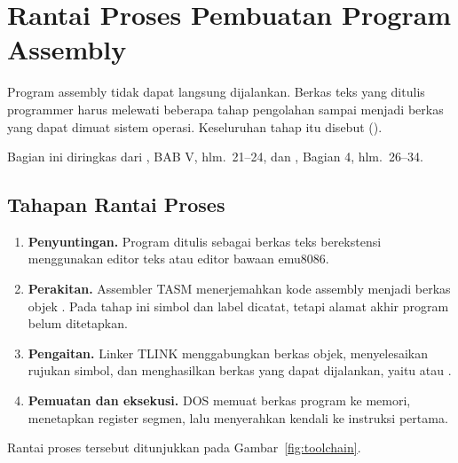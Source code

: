 \section{Rantai Proses Pembuatan Program Assembly}
\label{sec:rantai-proses}

Program assembly tidak dapat langsung dijalankan. Berkas teks yang
ditulis programmer harus melewati beberapa tahap pengolahan sampai
menjadi berkas yang dapat dimuat sistem operasi. Keseluruhan tahap
itu disebut  ().

Bagian ini diringkas dari \cite{sto2001}, BAB V, hlm.~21--24, dan
\cite{gunawan2019}, Bagian 4, hlm.~26--34.

\subsection{Tahapan Rantai Proses}

\begin{enumerate}
    \item \textbf{Penyuntingan.} Program ditulis sebagai berkas teks
          berekstensi  menggunakan editor teks atau editor
          bawaan emu8086.

    \item \textbf{Perakitan.} Assembler TASM menerjemahkan kode
          assembly menjadi berkas objek . Pada tahap ini
          simbol dan label dicatat, tetapi alamat akhir program belum
          ditetapkan.

    \item \textbf{Pengaitan.} Linker TLINK menggabungkan berkas objek,
          menyelesaikan rujukan simbol, dan menghasilkan berkas yang
          dapat dijalankan, yaitu  atau .

    \item \textbf{Pemuatan dan eksekusi.} DOS memuat berkas program ke
          memori, menetapkan register segmen, lalu menyerahkan kendali
          ke instruksi pertama.
\end{enumerate}

Rantai proses tersebut ditunjukkan pada Gambar~\ref{fig:toolchain}.

